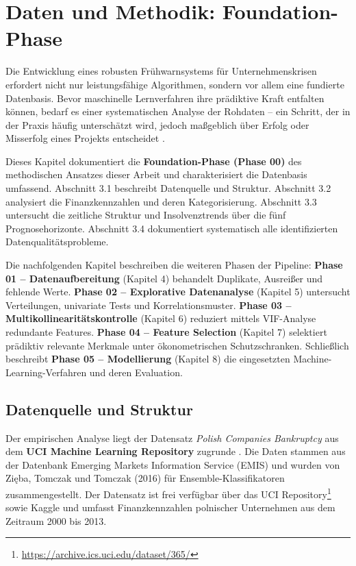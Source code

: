 \chapter{Daten und Methodik: Foundation-Phase}

Die Entwicklung eines robusten Frühwarnsystems für Unternehmenskrisen erfordert nicht nur leistungsfähige Algorithmen, sondern vor allem eine fundierte Datenbasis. Bevor maschinelle Lernverfahren ihre prädiktive Kraft entfalten können, bedarf es einer systematischen Analyse der Rohdaten – ein Schritt, der in der Praxis häufig unterschätzt wird, jedoch maßgeblich über Erfolg oder Misserfolg eines Projekts entscheidet \parencite{goodfellow2016deep}.

Dieses Kapitel dokumentiert die \textbf{Foundation-Phase (Phase 00)} des methodischen Ansatzes dieser Arbeit und charakterisiert die Datenbasis umfassend. Abschnitt 3.1 beschreibt Datenquelle und Struktur. Abschnitt 3.2 analysiert die Finanzkennzahlen und deren Kategorisierung. Abschnitt 3.3 untersucht die zeitliche Struktur und Insolvenztrends über die fünf Prognosehorizonte. Abschnitt 3.4 dokumentiert systematisch alle identifizierten Datenqualitätsprobleme.

Die nachfolgenden Kapitel beschreiben die weiteren Phasen der Pipeline: \textbf{Phase 01 -- Datenaufbereitung} (Kapitel 4) behandelt Duplikate, Ausreißer und fehlende Werte. \textbf{Phase 02 -- Explorative Datenanalyse} (Kapitel 5) untersucht Verteilungen, univariate Tests und Korrelationsmuster. \textbf{Phase 03 -- Multikollinearitätskontrolle} (Kapitel 6) reduziert mittels VIF-Analyse redundante Features. \textbf{Phase 04 -- Feature Selection} (Kapitel 7) selektiert prädiktiv relevante Merkmale unter ökonometrischen Schutzschranken. Schließlich beschreibt \textbf{Phase 05 -- Modellierung} (Kapitel 8) die eingesetzten Machine-Learning-Verfahren und deren Evaluation.

\section{Datenquelle und Struktur}

Der empirischen Analyse liegt der Datensatz \textit{Polish Companies Bankruptcy} aus dem \textbf{UCI Machine Learning Repository} zugrunde \parencite{zieba2016ensemble}. Die Daten stammen aus der Datenbank Emerging Markets Information Service (EMIS) und wurden von Zi\k{e}ba, Tomczak und Tomczak (2016) für Ensemble-Klassifikatoren zusammengestellt. Der Datensatz ist frei verfügbar über das UCI Repository\footnote{\url{https://archive.ics.uci.edu/dataset/365/}} sowie Kaggle und umfasst Finanzkennzahlen polnischer Unternehmen aus dem Zeitraum 2000 bis 2013.

